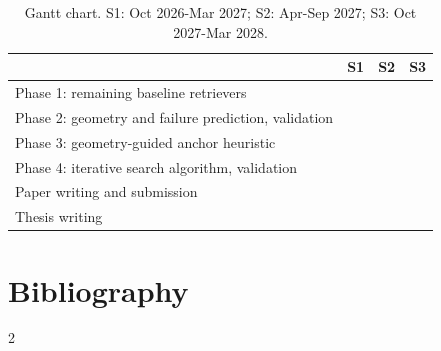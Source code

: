 \documentclass[12pt,a4paper]{article}
\begin{document}
\begin{table}[H]
\centering\small
\caption{Gantt chart. S1: Oct 2026-Mar 2027; S2: Apr-Sep 2027; S3: Oct 2027-Mar 2028.}
\setlength{\arrayrulewidth}{0.4pt}
\begin{tabular}{p{9.6cm}|p{1.4cm}|p{1.4cm}|p{1.4cm}|}
\toprule
 & \centering S1 & \centering S2 & \centering\arraybackslash S3 \\
\midrule
Phase 1: remaining baseline retrievers                   & \cellcolor{bgunavy!55} &   &   \\
Phase 2: geometry and failure prediction, validation     & \cellcolor{bgunavy!55} &   &   \\
Phase 3: geometry-guided anchor heuristic                & \cellcolor{bgunavy!55} & \cellcolor{bgunavy!55} &   \\
Phase 4: iterative search algorithm, validation          &   & \cellcolor{bgunavy!55} & \cellcolor{bgunavy!55} \\
Paper writing and submission                             &   & \cellcolor{bgunavy!25} & \cellcolor{bgunavy!25} \\
Thesis writing                                           &   &   & \cellcolor{bgunavy!25} \\
\bottomrule
\end{tabular}
\end{table}

\section*{Bibliography}
\renewcommand{\bibsection}{}
\begin{multicols}{2}
\scriptsize{}\setlength{\bibsep}{1.2pt}


\end{multicols}
\end{document}
